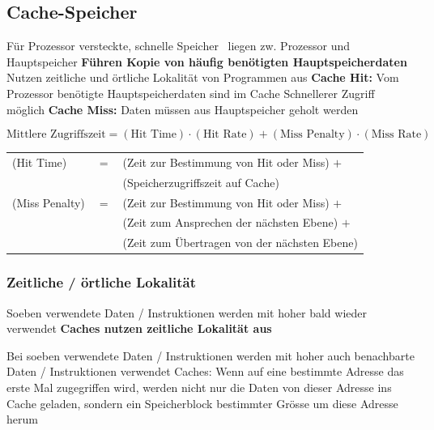 \subsection{Cache-Speicher}

\begin{outline}
    \1 Für Prozessor versteckte, schnelle Speicher \textrightarrow\ liegen zw. Prozessor und Hauptspeicher
    \1 \textbf{Führen Kopie von häufig benötigten Hauptspeicherdaten}
        \2 Nutzen zeitliche und örtliche Lokalität von Programmen aus
    \1 \textbf{Cache Hit:} Vom Prozessor benötigte Hauptspeicherdaten sind im Cache
        \2 Schnellerer Zugriff möglich
    \1 \textbf{Cache Miss:} Daten müssen aus Hauptspeicher geholt werden
 \end{outline}

 $$ \boxed{ \text{Mittlere Zugriffszeit} = (\text{Hit Time}) \cdot (\text{Hit Rate}) + (\text{Miss Penalty}) \cdot (\text{Miss Rate}) } $$


 \begin{tabular}{l c l}
    (Hit Time)      & $=$   & (Zeit zur Bestimmung von Hit oder Miss) $+$   \\
                    &       & (Speicherzugriffszeit auf Cache)              \\
    (Miss Penalty)  & $=$   & (Zeit zur Bestimmung von Hit oder Miss) $+$   \\
                    &       & (Zeit zum Ansprechen der nächsten Ebene) $+$  \\
                    &       & (Zeit zum Übertragen von der nächsten Ebene)
 \end{tabular}      


\subsubsection{Zeitliche / örtliche Lokalität}


\begin{outline}
    \1 Soeben verwendete Daten / Instruktionen werden mit hoher  bald wieder verwendet
        \2 \textbf{Caches nutzen zeitliche Lokalität aus}
\end{outline}



\begin{outline}
    \1 Bei soeben verwendete Daten / Instruktionen werden mit hoher  auch benachbarte Daten / Instruktionen verwendet
        \2 Caches: Wenn auf eine bestimmte Adresse das erste Mal zugegriffen wird, werden nicht nur die Daten von dieser Adresse ins Cache 
            geladen, sondern ein Speicherblock bestimmter Grösse um diese Adresse herum
\end{outline}

